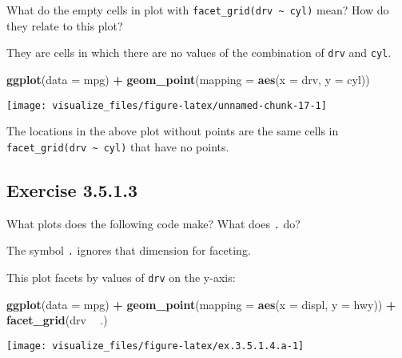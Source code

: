 \documentclass[]{book}
\newenvironment{Shaded}{\begin{snugshade}}{\end{snugshade}}
\newcommand{\DataTypeTok}[1]{\textcolor[rgb]{0.13,0.29,0.53}{#1}}
\newcommand{\KeywordTok}[1]{\textcolor[rgb]{0.13,0.29,0.53}{\textbf{#1}}}
\newcommand{\NormalTok}[1]{#1}
\newcommand{\OperatorTok}[1]{\textcolor[rgb]{0.81,0.36,0.00}{\textbf{#1}}}
\newcommand{\StringTok}[1]{\textcolor[rgb]{0.31,0.60,0.02}{#1}}
\theoremstyle{plain}
\theoremstyle{remark}
\begin{document}
What do the empty cells in plot with
\texttt{facet\_grid(drv\ \textasciitilde{}\ cyl)} mean? How do they
relate to this plot?

They are cells in which there are no values of the combination of
\texttt{drv} and \texttt{cyl}.

\begin{Shaded}
\begin{Highlighting}[]
\KeywordTok{ggplot}\NormalTok{(}\DataTypeTok{data =}\NormalTok{ mpg) }\OperatorTok{+}
\StringTok{  }\KeywordTok{geom_point}\NormalTok{(}\DataTypeTok{mapping =} \KeywordTok{aes}\NormalTok{(}\DataTypeTok{x =}\NormalTok{ drv, }\DataTypeTok{y =}\NormalTok{ cyl))}
\end{Highlighting}
\end{Shaded}

\begin{center}\texttt{[image: visualize\_files/figure-latex/unnamed-chunk-17-1]} \end{center}

The locations in the above plot without points are the same cells in
\texttt{facet\_grid(drv\ \textasciitilde{}\ cyl)} that have no points.

\hypertarget{exercise-3.5.1.3}{%
\subsection*{\texorpdfstring{Exercise
{3.5.1.3}}{Exercise 3.5.1.3}}\label{exercise-3.5.1.3}}

What plots does the following code make? What does \texttt{.} do?

The symbol \texttt{.} ignores that dimension for faceting.

This plot facets by values of \texttt{drv} on the y-axis:

\begin{Shaded}
\begin{Highlighting}[]
\KeywordTok{ggplot}\NormalTok{(}\DataTypeTok{data =}\NormalTok{ mpg) }\OperatorTok{+}
\StringTok{  }\KeywordTok{geom_point}\NormalTok{(}\DataTypeTok{mapping =} \KeywordTok{aes}\NormalTok{(}\DataTypeTok{x =}\NormalTok{ displ, }\DataTypeTok{y =}\NormalTok{ hwy)) }\OperatorTok{+}
\StringTok{  }\KeywordTok{facet_grid}\NormalTok{(drv }\OperatorTok{~}\StringTok{ }\NormalTok{.)}
\end{Highlighting}
\end{Shaded}

\begin{center}\texttt{[image: visualize\_files/figure-latex/ex.3.5.1.4.a-1]} \end{center}
\end{document}
